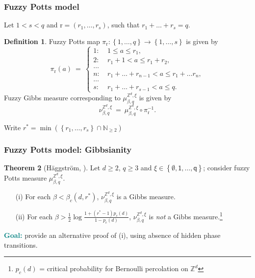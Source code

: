 \documentclass{beamer}
\newcommand{\N}{\mathbb{N}}
\renewcommand{\r}{\mathrm{r}}
\newcommand{\Z}{\mathbb{Z}}
\newcommand{\set}[1]{\left\{#1\right\}}
\newcommand{\ra}{\rightarrow}
\newcommand{\1}{\mathbbm{1}}
\newcommand{\5}{\vspace{0.5cm}}
\newcommand{\3}{\vspace{0.3cm}}
\theoremstyle{definition}
\newtheorem{thm}{Theorem}[section]
\newtheorem{df}[thm]{Definition}
\begin{document}

\begin{frame}
\frametitle{Fuzzy Potts model}
Let $1<s<q$ and $\r=(r_1,\ldots,r_s)$, such that $r_1+\ldots+r_s=q$.
\begin{df}
Fuzzy Potts map $\pi_\r:\set{1,\ldots,q}\ra\set{1,\ldots,s}$ is given by
$$\pi_\r(a) ~=~ \begin{cases}
1: ~&1\leq a\leq r_1, \\
2: ~&r_1+1<a\leq r_1+r_2, \\
\ldots \\
n: ~& r_1+\ldots+r_{n-1}<a\leq r_1+\ldots r_n, \\
\ldots \\
s: ~& r_1+\ldots+r_{s-1}<a\leq q.
\end{cases}$$
Fuzzy Gibbs measure corresponding to $\mu_{\beta,q}^{\Z^d,\xi}$ is given by
$$\nu_{\beta,q}^{\Z^d,\xi} ~=~ \mu_{\beta,q}^{\Z^d,\xi}\circ\pi_{\r}^{-1}.$$
\end{df}
\end{frame}

\begin{frame}
Write $r^*=\min(\set{r_1,\ldots,r_s}\cap\N_{\geq 2})$
\frametitle{Fuzzy Potts model: Gibbsianity}
\begin{thm}[H\"aggstr\"om, \cite{Hag}]
Let $d\geq 2$, $q\geq 3$ and $\xi\in\set{\emptyset,\mathsf{1},\ldots,\mathsf{q}}$; consider fuzzy Potts measure $\mu_{\beta,q}^{\Z^d,\xi}$.
\begin{itemize}
	\item[(i)] For each $\beta<\beta_c(d,r^*)$, $\nu_{\beta,q}^{\Z^d,\xi}$ is a Gibbs measure.
	\item[(ii)] For each $\beta>\frac{1}{2}\log\frac{1+(r^*-1)p_c(d)}{1-p_c(d)}$, $\nu_{\beta,q}^{\Z^d,\xi}$ is \textit{not} a Gibbs measure.\footnote{$p_c(d)$ = critical probability for Bernoulli percolation on $\Z^d$}
\end{itemize}
\end{thm}\vspace{0.3cm}
\textcolor{teal}{\textbf{Goal:}} provide an alternative proof of (i), using absence of hidden phase transitions.
\end{frame}

\end{document}
